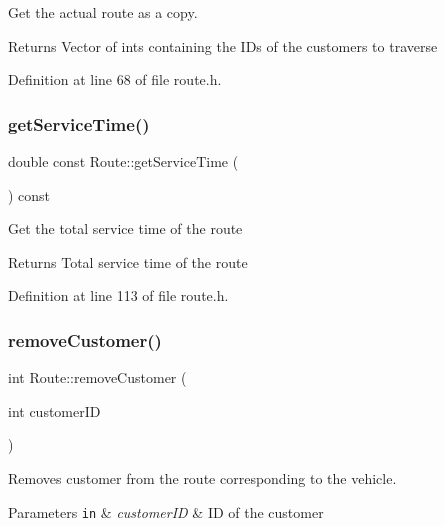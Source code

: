 Get the actual route as a copy. \begin{DoxyReturn}{Returns}
Vector of ints containing the I\+Ds of the customers to traverse 
\end{DoxyReturn}


Definition at line 68 of file route.\+h.

\mbox{\label{class_route_ae30f973f4cb746802cf54d9f1827445f}} 
\subsubsection{\texorpdfstring{get\+Service\+Time()}{getServiceTime()}}
{\footnotesize\ttfamily double const Route\+::get\+Service\+Time (\begin{DoxyParamCaption}{ }\end{DoxyParamCaption}) const\hspace{0.3cm}{\ttfamily [inline]}}

Get the total service time of the route \begin{DoxyReturn}{Returns}
Total service time of the route 
\end{DoxyReturn}


Definition at line 113 of file route.\+h.

\mbox{\label{class_route_a3e52680923dc08fe57d7a622cf8ad17b}} 
\subsubsection{\texorpdfstring{remove\+Customer()}{removeCustomer()}}
{\footnotesize\ttfamily int Route\+::remove\+Customer (\begin{DoxyParamCaption}\item[{int}]{customer\+ID }\end{DoxyParamCaption})}



Removes customer from the route corresponding to the vehicle. 


\begin{DoxyParams}[1]{Parameters}
\mbox{\tt in}  & {\em customer\+ID} & ID of the customer \\
\hline
\end{DoxyParams}


